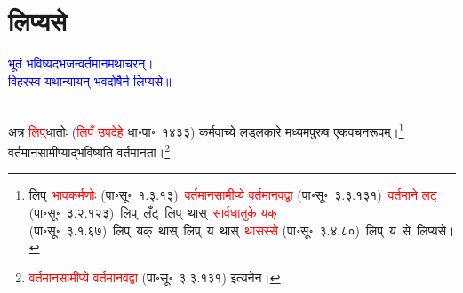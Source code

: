 \section[लिप्यसे]{लिप्यसे}
\centering\textcolor{blue}{भूतं भविष्यदभजन्वर्तमानमथाचरन्।\nopagebreak\\
विहरस्व यथान्यायन् भवदोषैर्न लिप्यसे॥}\nopagebreak\\
\\
\fontsize{14}{21}\selectfont\begin{sloppypar}\justifying\noindent\hspace{10mm} अत्र \textcolor{red}{लिप्‌}\-धातोः (\textcolor{red}{लिपँ उपदेहे} धा॰पा॰~१४३३) कर्मवाच्ये लड्लकारे मध्यमपुरुष एकवचनरूपम्।\footnote{लिप्~\arrow \textcolor{red}{भावकर्मणोः} (पा॰सू॰~१.३.१३)~\arrow \textcolor{red}{वर्तमान\-सामीप्ये वर्तमानवद्वा} (पा॰सू॰~३.३.१३१)~\arrow \textcolor{red}{वर्तमाने लट्} (पा॰सू॰~३.२.१२३)~\arrow लिप्~लँट्~\arrow लिप्~थास्~\arrow \textcolor{red}{सार्वधातुके यक्} (पा॰सू॰~३.१.६७)~\arrow लिप्~यक्~थास्~\arrow लिप्~य~थास्~\arrow \textcolor{red}{थासस्से} (पा॰सू॰~३.४.८०)~\arrow लिप्~य~से~\arrow लिप्यसे।} वर्तमानसामीप्याद्भविष्यति वर्तमानता।\footnote{\textcolor{red}{वर्तमान\-सामीप्ये वर्तमानवद्वा} (पा॰सू॰~३.३.१३१) इत्यनेन।}\end{sloppypar}

